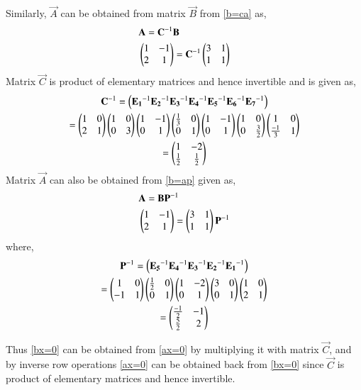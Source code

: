 \documentclass[journal,12pt,twocolumn]{IEEEtran}
\begin{document}
Similarly, $\vec{A}$ can be obtained from matrix $\vec{B}$ from \eqref{b=ca} as, 
\begin{align}
    &\mathbf{A} = \mathbf{C}^{-1}\mathbf{B}\label{a=c-1b}\\
    &\begin{pmatrix}1&-1\\2&1\end{pmatrix} = \mathbf{C}^{-1}\begin{pmatrix}3&1\\1&1\end{pmatrix} \label{eq:c-1b}
\end{align}
Matrix $\vec{C}$ is product of elementary matrices and hence invertible and is given as, 
\begin{multline}
    \mathbf{C}^{-1} = \left(\mathbf{E_1}^{-1}\mathbf{E_2}^{-1}\mathbf{E_3}^{-1}\mathbf{E_4}^{-1}
    \mathbf{E_5}^{-1}\mathbf{E_6}^{-1}\mathbf{E_7}^{-1}\right) \\
    = \begin{pmatrix}1&0\\2&1\end{pmatrix}\begin{pmatrix}1&0\\0&3\end{pmatrix}\begin{pmatrix}1&-1\\0&1\end{pmatrix}\begin{pmatrix}\frac{1}{3}&0\\0&1\end{pmatrix}\begin{pmatrix}1&-1\\0&1\end{pmatrix}\begin{pmatrix}1&0\\0&\frac{3}{2}\end{pmatrix}\begin{pmatrix}1&0\\ \frac{-1}{3}&1\end{pmatrix} \\
    =\begin{pmatrix}1&-2\\ \frac{1}{2}&\frac{1}{2}\end{pmatrix}
\end{multline}
Matrix $\vec{A}$ can also be obtained from \eqref{b=ap} given as, 
\begin{align}
    &\mathbf{A} = \mathbf{B}\mathbf{P}^{-1} \\
    &\begin{pmatrix}1&-1\\2&1\end{pmatrix} = \begin{pmatrix}3&1\\1&1\end{pmatrix}\mathbf{P}^{-1}
\end{align}
where, 
\begin{multline}
    \mathbf{P}^{-1} = \left(\mathbf{E_5}^{-1}\mathbf{E_4}^{-1}\mathbf{E_3}^{-1}\mathbf{E_2}^{-1}\mathbf{E_1}^{-1}\right) \\
    = \begin{pmatrix}1&0\\-1&1\end{pmatrix}\begin{pmatrix}\frac{1}{2}&0\\0&1\end{pmatrix}\begin{pmatrix}1&-2\\0&1\end{pmatrix}\begin{pmatrix}3&0\\0&1\end{pmatrix}\begin{pmatrix}1&0\\2&1\end{pmatrix} \\
    =\begin{pmatrix}\frac{-1}{2}&-1\\ \frac{5}{2}&2\end{pmatrix}
\end{multline}

Thus \eqref{bx=0} can be obtained from \eqref{ax=0} by multiplying it with matrix $\vec{C}$, and by inverse row operations \eqref{ax=0} can be obtained back from \eqref{bx=0} since $\vec{C}$ is product of elementary matrices and hence invertible. 
\end{document}
